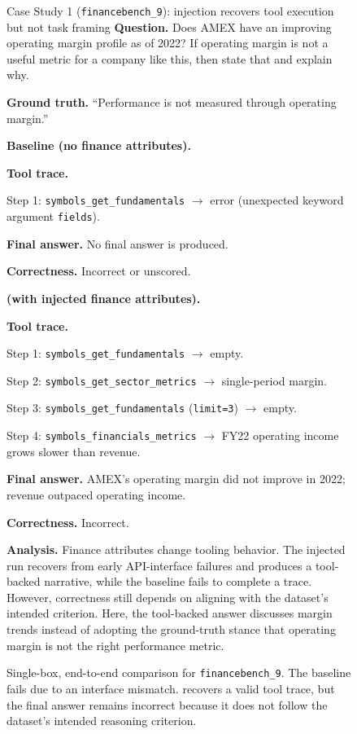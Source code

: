 \begin{figure}[htbp]
\begin{casecard}{Case Study 1 (\texttt{financebench\_9}): injection recovers tool execution but not task framing}
\textbf{Question.} Does AMEX have an improving operating margin profile as of 2022? If operating margin is not a useful metric for a company like this, then state that and explain why.\par
\smallskip
\textbf{Ground truth.} ``Performance is not measured through operating margin.''\par
\medskip
\begin{minipage}[t]{0.49\textwidth}
\textbf{Baseline (no finance attributes).}\par
\textbf{Tool trace.}\par
Step 1: \texttt{symbols\_get\_fundamentals} $\rightarrow$ error (unexpected keyword argument \texttt{fields}).\par
\textbf{Final answer.} No final answer is produced.\par
\textbf{Correctness.} Incorrect or unscored.\par
\end{minipage}\hfill
\begin{minipage}[t]{0.49\textwidth}
\textbf{\methodname{} (with injected finance attributes).}\par
\textbf{Tool trace.}\par
Step 1: \texttt{symbols\_get\_fundamentals} $\rightarrow$ empty.\par
Step 2: \texttt{symbols\_get\_sector\_metrics} $\rightarrow$ single-period margin.\par
Step 3: \texttt{symbols\_get\_fundamentals} (\texttt{limit=3}) $\rightarrow$ empty.\par
Step 4: \texttt{symbols\_financials\_metrics} $\rightarrow$ FY22 operating income grows slower than revenue.\par
\textbf{Final answer.} AMEX’s operating margin did not improve in 2022; revenue outpaced operating income.\par
\textbf{Correctness.} Incorrect.\par
\end{minipage}
\medskip

\textbf{Analysis.} Finance attributes change tooling behavior. The injected run recovers from early API-interface failures and produces a tool-backed narrative, while the baseline fails to complete a trace. However, correctness still depends on aligning with the dataset's intended criterion. Here, the tool-backed answer discusses margin trends instead of adopting the ground-truth stance that operating margin is not the right performance metric.\par
\end{casecard}
\caption{Single-box, end-to-end comparison for \texttt{financebench\_9}. The baseline fails due to an interface mismatch. \methodname{} recovers a valid tool trace, but the final answer remains incorrect because it does not follow the dataset's intended reasoning criterion.}
\label{fig:case_study_financebench_margin}
\end{figure}

